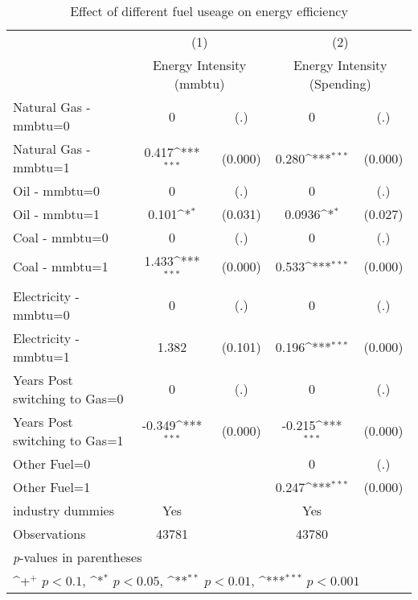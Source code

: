 \begin{table}[htbp]\centering
\def\sym#1{\ifmmode^{#1}\else\(^{#1}\)\fi}
\caption{Effect of different fuel useage on energy efficiency}
\begin{tabular}{l*{2}{cc}}
\toprule
                    &\multicolumn{2}{c}{(1)}           &\multicolumn{2}{c}{(2)}           \\
                    &\multicolumn{2}{c}{Energy Intensity (mmbtu)}&\multicolumn{2}{c}{Energy Intensity (Spending)}\\
\midrule
Natural Gas - mmbtu=0&           0         &         (.)&           0         &         (.)\\
Natural Gas - mmbtu=1&       0.417\sym{***}&     (0.000)&       0.280\sym{***}&     (0.000)\\
Oil - mmbtu=0       &           0         &         (.)&           0         &         (.)\\
Oil - mmbtu=1       &       0.101\sym{*}  &     (0.031)&      0.0936\sym{*}  &     (0.027)\\
Coal - mmbtu=0      &           0         &         (.)&           0         &         (.)\\
Coal - mmbtu=1      &       1.433\sym{***}&     (0.000)&       0.533\sym{***}&     (0.000)\\
Electricity - mmbtu=0&           0         &         (.)&           0         &         (.)\\
Electricity - mmbtu=1&       1.382         &     (0.101)&       0.196\sym{***}&     (0.000)\\
Years Post switching to Gas=0&           0         &         (.)&           0         &         (.)\\
Years Post switching to Gas=1&      -0.349\sym{***}&     (0.000)&      -0.215\sym{***}&     (0.000)\\
Other Fuel=0        &                     &            &           0         &         (.)\\
Other Fuel=1        &                     &            &       0.247\sym{***}&     (0.000)\\
industry dummies    &         Yes         &            &         Yes         &            \\
\midrule
Observations        &       43781         &            &       43780         &            \\
\bottomrule
\multicolumn{5}{l}{\footnotesize \textit{p}-values in parentheses}\\
\multicolumn{5}{l}{\footnotesize \sym{+} \(p<0.1\), \sym{*} \(p<0.05\), \sym{**} \(p<0.01\), \sym{***} \(p<0.001\)}\\
\end{tabular}
\end{table}
